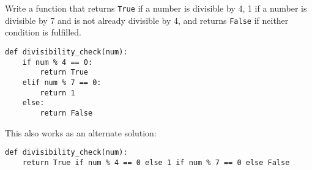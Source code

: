 \begin{blocksection}
\question Write a function that returns \lstinline{True} if a number is divisible by 4, 1 if a number is divisible by 7 and is not already divisible by 4, and returns \lstinline{False} if neither condition is fulfilled.







\vspace{2in}
\begin{solution}[1in]
\begin{lstlisting}
def divisibility_check(num):
    if num % 4 == 0:
        return True
    elif num % 7 == 0:
        return 1
    else:
        return False
\end{lstlisting}
This also works as an alternate solution:
\begin{lstlisting}
def divisibility_check(num):
    return True if num % 4 == 0 else 1 if num % 7 == 0 else False
\end{lstlisting}
\end{solution}
\end{blocksection}